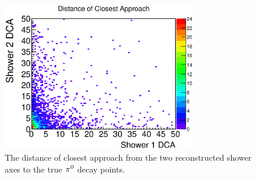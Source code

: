 \begin{figure}[htbp]
\begin{center}
\includegraphics[width=0.75\textwidth]{figs/mc/single_pi0/pi0_DCA.eps}
\caption{The distance of closest approach from the two reconstructed
shower axes to the true ${\pi}^0$ decay points.}
\label{fig:dca_single_pi0}
\end{center}
\end{figure}
